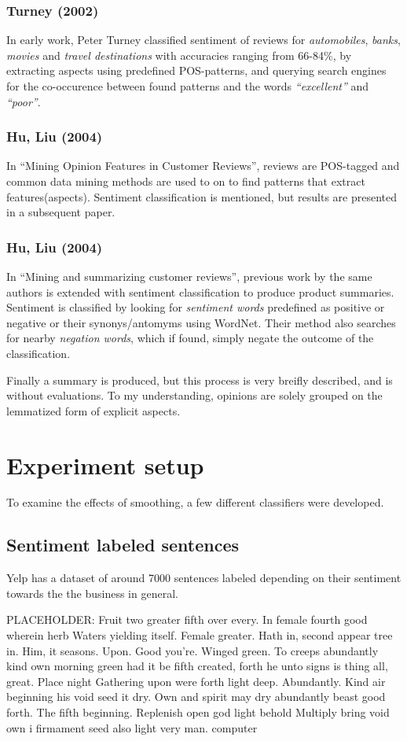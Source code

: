 \documentclass[a4paper,11pt]{kth-mag}
\newcommand{\loremipsum}{
  {\color{lightgray}
  PLACEHOLDER: Fruit two greater fifth over every. In female fourth good wherein herb
  Waters yielding itself. Female greater. Hath in, second appear tree in.
  Him, it seasons. Upon. Good you're. Winged green. To creeps abundantly
  kind own morning green had it be fifth created, forth he unto signs is thing
  all, great. Place night Gathering upon were forth light deep. Abundantly.
  Kind air beginning his void seed it dry. Own and spirit may dry abundantly
  beast good forth. The fifth beginning. Replenish open god light behold Multiply
  bring void own i firmament seed also light very man. \gls{computer}

  }
}
\begin{document}
\subsubsection{Turney (2002)}
In early work, Peter Turney classified sentiment of reviews for \emph{automobiles}, \emph{banks}, \emph{movies} and \emph{travel destinations} with accuracies ranging from 66-84\%, by extracting aspects using predefined POS-patterns, and querying search engines for the co-occurence between found patterns and the words \emph{``excellent''} and \emph{``poor''}.

\subsubsection{Hu, Liu (2004)}
In ``Mining Opinion Features in Customer Reviews'', reviews are POS-tagged and common data mining methods are used to on to find patterns that extract features(aspects). Sentiment classification is mentioned, but results are presented in a subsequent paper.

\subsubsection{Hu, Liu (2004)}
In ``Mining and summarizing customer reviews'', previous work by the same authors is extended with sentiment classification to produce product summaries. Sentiment is classified by looking for \emph{sentiment words} predefined as positive or negative or their synonys/antomyms using WordNet. Their method also searches for nearby \emph{negation words}, which if found, simply negate the outcome of the classification.

Finally a summary is produced, but this process is very breifly described, and is without evaluations. To my understanding, opinions are solely grouped on the lemmatized form of explicit aspects.


\section{Experiment setup}
To examine the effects of smoothing, a few different classifiers were developed.


\subsection{Sentiment labeled sentences}
Yelp has a dataset of around 7000 sentences labeled depending on their sentiment towards the the business in general.
\loremipsum
\end{document}
